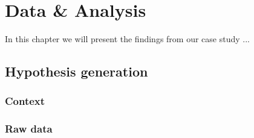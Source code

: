 \chapter{Data \& Analysis}
In this chapter we will present the findings from our case study ...

\section{Hypothesis generation}

\subsection{Context}
\subsection{Raw data}
\def\arraystretch{2.2}
